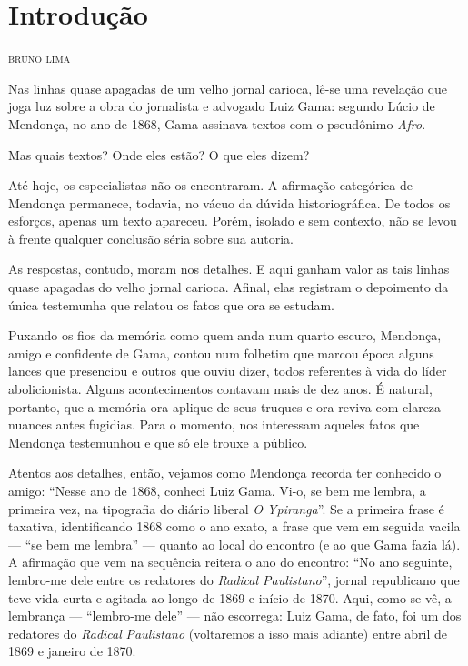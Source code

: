 \chapter{Introdução}

\begin{flushright}
\textsc{bruno lima}
\end{flushright}

Nas linhas quase apagadas de um velho jornal carioca, lê-se uma
revelação que joga luz sobre a obra do jornalista e advogado Luiz Gama:
segundo Lúcio de Mendonça, no ano de 1868, Gama assinava textos com o
pseudônimo \emph{Afro}.

Mas quais textos? Onde eles estão? O que eles dizem?

Até hoje, os especialistas não os encontraram. A afirmação categórica de
Mendonça permanece, todavia, no vácuo da dúvida historiográfica. De
todos os esforços, apenas um texto apareceu. Porém, isolado e sem
contexto, não se levou à frente qualquer conclusão séria sobre sua
autoria.

As respostas, contudo, moram nos detalhes. E aqui ganham valor as tais
linhas quase apagadas do velho jornal carioca. Afinal, elas registram o
depoimento da única testemunha que relatou os fatos que ora se estudam.

Puxando os fios da memória como quem anda num quarto escuro, Mendonça,
amigo e confidente de Gama, contou num folhetim que marcou época alguns
lances que presenciou e outros que ouviu dizer, todos referentes à vida
do líder abolicionista. Alguns acontecimentos contavam mais de dez anos.
É natural, portanto, que a memória ora aplique de seus truques e ora
reviva com clareza nuances antes fugidias. Para o momento, nos
interessam aqueles fatos que Mendonça testemunhou e que só ele trouxe a
público.

Atentos aos detalhes, então, vejamos como Mendonça recorda ter conhecido
o amigo: ``Nesse ano de 1868, conheci Luiz Gama. Vi-o, se bem me lembra,
a primeira vez, na tipografia do diário liberal \emph{O Ypiranga}''. Se a
primeira frase é taxativa, identificando 1868 como o ano exato, a frase
que vem em seguida vacila --- ``se bem me lembra'' --- quanto ao local do
encontro (e ao que Gama fazia lá). A afirmação que vem na sequência
reitera o ano do encontro: ``No ano seguinte, lembro-me dele entre os
redatores do \emph{Radical Paulistano}'', jornal republicano que teve
vida curta e agitada ao longo de 1869 e início de 1870. Aqui, como se
vê, a lembrança --- ``lembro-me dele'' --- não escorrega: Luiz Gama, de
fato, foi um dos redatores do \emph{Radical} \emph{Paulistano}
(voltaremos a isso mais adiante) entre abril de 1869 e janeiro de 1870.

